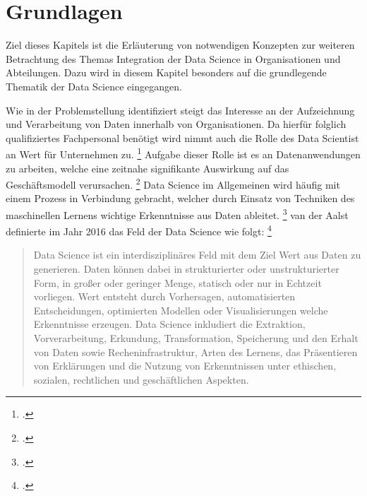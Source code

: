 \chapter[Grundlagen]{Grundlagen}

Ziel dieses Kapitels ist die Erläuterung von notwendigen Konzepten zur weiteren Betrachtung des Themas Integration der Data Science in Organisationen und Abteilungen.
Dazu wird in diesem Kapitel besonders auf die grundlegende Thematik der Data Science eingegangen.

Wie in der Problemstellung identifiziert steigt das Interesse an der Aufzeichnung und Verarbeitung von Daten innerhalb von Organisationen. 
Da hierfür folglich qualifiziertes Fachpersonal benötigt wird nimmt auch die Rolle des Data Scientist an Wert für Unternehmen zu. \footcite[Vgl.][S. 1]{Fabijan.2017}
Aufgabe dieser Rolle ist es an Datenanwendungen zu arbeiten, welche eine zeitnahe signifikante Auswirkung auf das Geschäftsmodell verursachen. \footcite[Vgl.][S. 12]{Patil.2011}
Data Science im Allgemeinen wird häufig mit einem Prozess in Verbindung gebracht, welcher durch Einsatz von Techniken des maschinellen Lernens wichtige Erkenntnisse aus Daten ableitet. \footcite[Vgl.][S. 1]{Zhang.2020b}
van der Aalst definierte im Jahr 2016 das Feld der Data Science wie folgt: \footcite[Vgl.][S. 10]{vanderAalst.2016}


\begin{quotation}
    Data Science ist ein interdisziplinäres Feld mit dem Ziel Wert aus Daten zu generieren.
    Daten können dabei in strukturierter oder unstrukturierter Form, in großer oder geringer Menge, statisch oder nur in Echtzeit vorliegen.
    Wert entsteht durch Vorhersagen, automatisierten Entscheidungen, optimierten Modellen oder Visualisierungen welche Erkenntnisse erzeugen.
    Data Science inkludiert die Extraktion, Vorverarbeitung, Erkundung, Transformation, Speicherung und den Erhalt von Daten sowie Recheninfrastruktur, Arten des Lernens, das Präsentieren von Erklärungen und die Nutzung von Erkenntnissen unter ethischen, sozialen, rechtlichen und geschäftlichen Aspekten.
\end{quotation}


